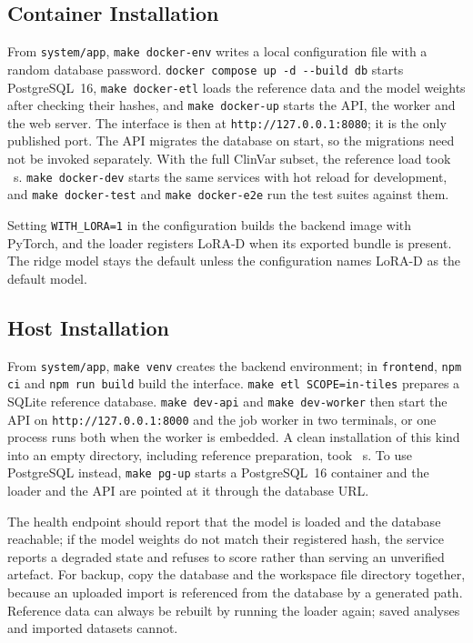 \subsection{Container Installation}
From \nolinkurl{system/app}, \texttt{make docker-env} writes a local configuration file with a
random database password. \texttt{docker compose up -d -{}-build db} starts PostgreSQL~16,
\texttt{make docker-etl} loads the reference data and the model weights after checking their
hashes, and \texttt{make docker-up} starts the API, the worker and the web server. The interface is
then at \nolinkurl{http://127.0.0.1:8080}; it is the only published port. The API migrates the
database on start, so the \nAppMigrations{} migrations need not be invoked separately. With the full
ClinVar subset, the reference load took \nAppEtlSeconds{}~s.
\texttt{make docker-dev} starts the same services with hot reload for development, and
\texttt{make docker-test} and \texttt{make docker-e2e} run the test suites against them.

Setting \texttt{WITH\_LORA=1} in the configuration builds the backend image with PyTorch, and the
loader registers LoRA-D when its exported bundle is present. The ridge model stays the default unless
the configuration names LoRA-D as the default model.

\subsection{Host Installation}
From \nolinkurl{system/app}, \texttt{make venv} creates the backend environment; in
\nolinkurl{frontend}, \texttt{npm ci} and \texttt{npm run build} build the interface.
\texttt{make etl SCOPE=in-tiles} prepares a SQLite reference database. \texttt{make dev-api}
and \texttt{make dev-worker} then start the API on \nolinkurl{http://127.0.0.1:8000} and the job
worker in two terminals, or one process runs both when the worker is embedded. A clean installation
of this kind into an empty directory, including reference preparation, took
\nAppInstallSeconds{}~s. To use PostgreSQL instead, \texttt{make pg-up} starts a PostgreSQL~16
container and the loader and the API are pointed at it through the database URL.

The health endpoint should report that the model is loaded and the database reachable; if the model
weights do not match their registered hash, the service reports a degraded state and refuses to score
rather than serving an unverified artefact. For backup, copy the database and the workspace file
directory together, because an uploaded import is referenced from the database by a generated path.
Reference data can always be rebuilt by running the loader again; saved analyses and imported
datasets cannot.


